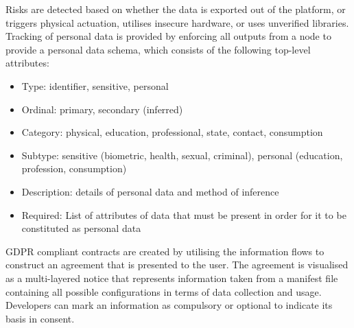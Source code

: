 Risks are detected based on whether the data is exported out of the platform, or triggers physical actuation, utilises insecure hardware, or uses unverified libraries. Tracking of personal data is provided by enforcing all outputs from a node to provide a personal data schema, which consists of the following top-level attributes:
\begin{itemize}
    \item Type: identifier, sensitive, personal
    \item Ordinal: primary, secondary (inferred)
    \item Category: physical, education, professional, state, contact, consumption
    \item Subtype: sensitive (biometric, health, sexual, criminal), personal (education, profession, consumption)
    \item Description: details of personal data and method of inference
    \item Required: List of attributes of data that must be present in order for it to be constituted as personal data
\end{itemize}

GDPR compliant contracts are created by utilising the information flows to construct an agreement that is presented to the user. The agreement is visualised as a multi-layered notice that represents information taken from a manifest file containing all possible configurations in terms of data collection and usage. Developers can mark an information as compulsory or optional to indicate its basis in consent.

